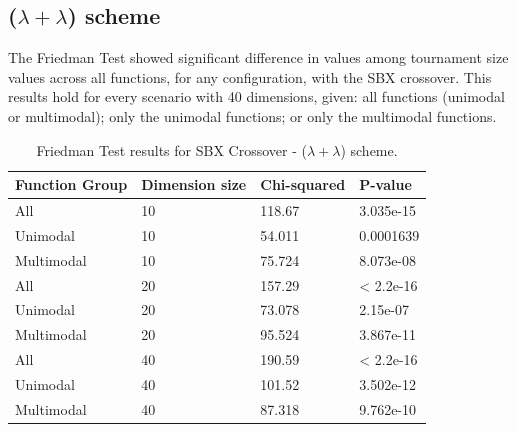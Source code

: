 \subsection{($\lambda + \lambda$) scheme}


The Friedman Test showed significant difference in values among tournament size values across all functions, for any configuration, with the SBX crossover. This results hold for every scenario with 40 dimensions, given: all functions (unimodal or multimodal); only the unimodal functions; or only the multimodal functions. 

\begin{table}[h]
	\centering
	\begin{tabular}{|l|l|l|l|}
		\hline
		\textbf{Function Group} & \textbf{Dimension size}      & \textbf{Chi-squared}        & \textbf{P-value}                     \\ \hline
		\multicolumn{1}{|l|}{All} & \multicolumn{1}{|l|}{10} & \multicolumn{1}{l|}{118.67} & \multicolumn{1}{l|}{3.035e-15} \\ \hline
		\multicolumn{1}{|l|}{Unimodal} & \multicolumn{1}{|l|}{10} & \multicolumn{1}{l|}{54.011} & \multicolumn{1}{l|}{0.0001639} \\ \hline
		\multicolumn{1}{|l|}{Multimodal} & \multicolumn{1}{|l|}{10} & \multicolumn{1}{l|}{75.724} & \multicolumn{1}{l|}{8.073e-08}  \\ \hline
		\hline
		\multicolumn{1}{|l|}{All} & \multicolumn{1}{|l|}{20} & \multicolumn{1}{l|}{157.29} & \multicolumn{1}{l|}{< 2.2e-16} \\ \hline
		\multicolumn{1}{|l|}{Unimodal} & \multicolumn{1}{|l|}{20} & \multicolumn{1}{l|}{73.078} & \multicolumn{1}{l|}{2.15e-07} \\ \hline
		\multicolumn{1}{|l|}{Multimodal} & \multicolumn{1}{|l|}{20} & \multicolumn{1}{l|}{95.524} & \multicolumn{1}{l|}{3.867e-11}  \\ \hline
		\hline	
		\multicolumn{1}{|l|}{All} & \multicolumn{1}{|l|}{40} & \multicolumn{1}{l|}{190.59} & \multicolumn{1}{l|}{< 2.2e-16} 						\\ \hline
		\multicolumn{1}{|l|}{Unimodal} & \multicolumn{1}{|l|}{40} & \multicolumn{1}{l|}{101.52} & \multicolumn{1}{l|}{3.502e-12} \\ \hline
		\multicolumn{1}{|l|}{Multimodal} & \multicolumn{1}{|l|}{40} & \multicolumn{1}{l|}{87.318} & \multicolumn{1}{l|}{9.762e-10}  \\ \hline
	\end{tabular}
	\caption{Friedman Test results for SBX Crossover - ($\lambda + \lambda$) scheme.}
	\label{Friedman_test_uniform-B}	
\end{table}

